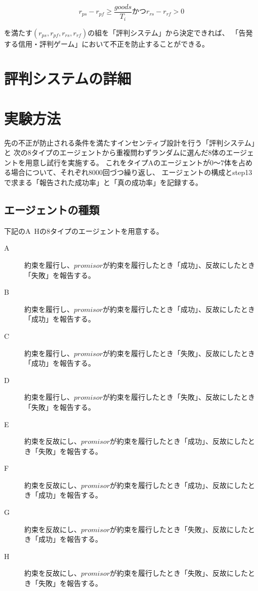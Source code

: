 \begin{equation}
  r_{ps} - r_{pf} \geq \frac{goods}{T_i} かつ r_{rs} - r_{rf} > 0
\end{equation}

を満たす$ (r_{ps}, r_{pf}, r_{rs}, r_{rf}) $の組を「評判システム」から決定できれば、
「告発する信用・評判ゲーム」において不正を防止することができる。

\section{評判システムの詳細}


\section{実験方法}
先の不正が防止される条件を満たすインセンティブ設計を行う「評判システム」と
次の8タイプのエージェントから重複問わずランダムに選んだ8体のエージェントを用意し試行を実施する。
これをタイプAのエージェントが0〜7体を占める場合について、それぞれ8000回づつ繰り返し、
エージェントの構成とstep13で求まる「報告された成功率」と「真の成功率」を記録する。

\subsection{エージェントの種類}
下記のA~Hの8タイプのエージェントを用意する。
\begin{description}
  \item [A] 約束を履行し、$promisor$が約束を履行したとき「成功」、反故にしたとき「失敗」を報告する。
  \item [B] 約束を履行し、$promisor$が約束を履行したとき「成功」、反故にしたとき「成功」を報告する。
  \item [C] 約束を履行し、$promisor$が約束を履行したとき「失敗」、反故にしたとき「成功」を報告する。
  \item [D] 約束を履行し、$promisor$が約束を履行したとき「失敗」、反故にしたとき「失敗」を報告する。
  \item [E] 約束を反故にし、$promisor$が約束を履行したとき「成功」、反故にしたとき「失敗」を報告する。
  \item [F] 約束を反故にし、$promisor$が約束を履行したとき「成功」、反故にしたとき「成功」を報告する。
  \item [G] 約束を反故にし、$promisor$が約束を履行したとき「失敗」、反故にしたとき「成功」を報告する。
  \item [H] 約束を反故にし、$promisor$が約束を履行したとき「失敗」、反故にしたとき「失敗」を報告する。
\end{description}

